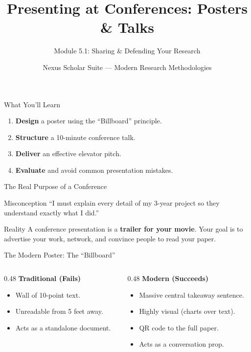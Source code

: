 \documentclass[aspectratio=169]{beamer}
\title{Presenting at Conferences: Posters \& Talks}
\subtitle{Module 5.1: Sharing \& Defending Your Research}
\author{Nexus Scholar Suite --- Modern Research Methodologies}
\date{}
\begin{document}
\begin{frame}[plain]
  \titlepage
\end{frame}

\begin{frame}{What You'll Learn}
  \begin{enumerate}
    \item \textbf{Design} a poster using the ``Billboard'' principle.
    \item \textbf{Structure} a 10-minute conference talk.
    \item \textbf{Deliver} an effective elevator pitch.
    \item \textbf{Evaluate} and avoid common presentation mistakes.
  \end{enumerate}
\end{frame}

\begin{frame}{The Real Purpose of a Conference}
  \begin{alertblock}{Misconception}
    ``I must explain every detail of my 3-year project so they understand exactly what I did.''
  \end{alertblock}
  \vspace{0.5cm}
  \begin{exampleblock}{Reality}
    A conference presentation is a \textbf{trailer for your movie}. Your goal is to advertise your work, network, and convince people to read your paper.
  \end{exampleblock}
\end{frame}

\begin{frame}{The Modern Poster: The ``Billboard''}
  \begin{columns}[T]
    \begin{column}{0.48\textwidth}
      \textbf{Traditional (Fails)}
      \begin{itemize}
        \item Wall of 10-point text.
        \item Unreadable from 5 feet away.
        \item Acts as a standalone document.
      \end{itemize}
    \end{column}
    \begin{column}{0.48\textwidth}
      \textbf{Modern (Succeeds)}
      \begin{itemize}
        \item Massive central takeaway sentence.
        \item Highly visual (charts over text).
        \item QR code to the full paper.
        \item Acts as a conversation prop.
      \end{itemize}
    \end{column}
  \end{columns}
\end{frame}
\end{document}
